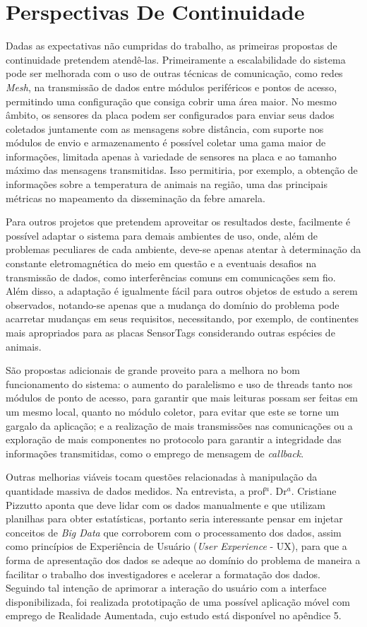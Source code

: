 \section{Perspectivas De Continuidade}

Dadas as expectativas não cumpridas do trabalho, as primeiras propostas de continuidade pretendem atendê-las. Primeiramente a escalabilidade do sistema pode ser melhorada com o uso de outras técnicas de comunicação, como redes \emph{Mesh}, na transmissão de dados entre módulos periféricos e pontos de acesso, permitindo uma configuração que consiga cobrir uma área maior. No mesmo âmbito, os sensores da placa podem ser configurados para enviar seus dados coletados juntamente com as mensagens sobre distância, com suporte nos módulos de envio e armazenamento é possível coletar uma gama maior de informações, limitada apenas à variedade de sensores na placa e ao tamanho máximo das mensagens transmitidas. Isso permitiria, por exemplo, a obtenção de informações sobre a temperatura de animais na região, uma das principais métricas no mapeamento da disseminação da febre amarela.

Para outros projetos que pretendem aproveitar os resultados deste, facilmente é possível adaptar o sistema para demais ambientes de uso, onde, além de problemas peculiares de cada ambiente, deve-se apenas atentar à determinação da constante eletromagnética do meio em questão e a eventuais desafios na transmissão de dados, como interferências comuns em comunicações sem fio. Além disso, a adaptação é igualmente fácil para outros objetos de estudo a serem observados, notando-se apenas que a mudança do domínio do problema pode acarretar mudanças em seus requisitos, necessitando, por exemplo, de continentes mais apropriados para as placas SensorTags considerando outras espécies de animais.

São propostas adicionais de grande proveito para a melhora no bom funcionamento do sistema: o aumento do paralelismo e uso de threads tanto nos módulos de ponto de acesso, para garantir que mais leituras possam ser feitas em um mesmo local, quanto no módulo coletor, para evitar que este se torne um gargalo da aplicação; e a realização de mais transmissões nas comunicações ou a exploração de mais componentes no protocolo para garantir a integridade das informações transmitidas, como o emprego de mensagem de \emph{callback}.

Outras melhorias viáveis tocam questões relacionadas à manipulação da quantidade massiva de dados medidos. Na entrevista, a prof$^a$. Dr$^a$. Cristiane Pizzutto aponta que deve lidar com os dados manualmente e que utilizam planilhas para obter estatísticas, portanto seria interessante pensar em injetar conceitos de \emph{Big Data} que corroborem com o processamento dos dados, assim como princípios de Experiência de Usuário (\emph{User Experience} - UX), para que a forma de apresentação dos dados se adeque ao domínio do problema de maneira a facilitar o trabalho dos investigadores e acelerar a formatação dos dados. Seguindo tal intenção de aprimorar a interação do usuário com a interface disponibilizada, foi realizada prototipação de uma possível aplicação móvel com emprego de Realidade Aumentada, cujo estudo está disponível no apêndice 5.

